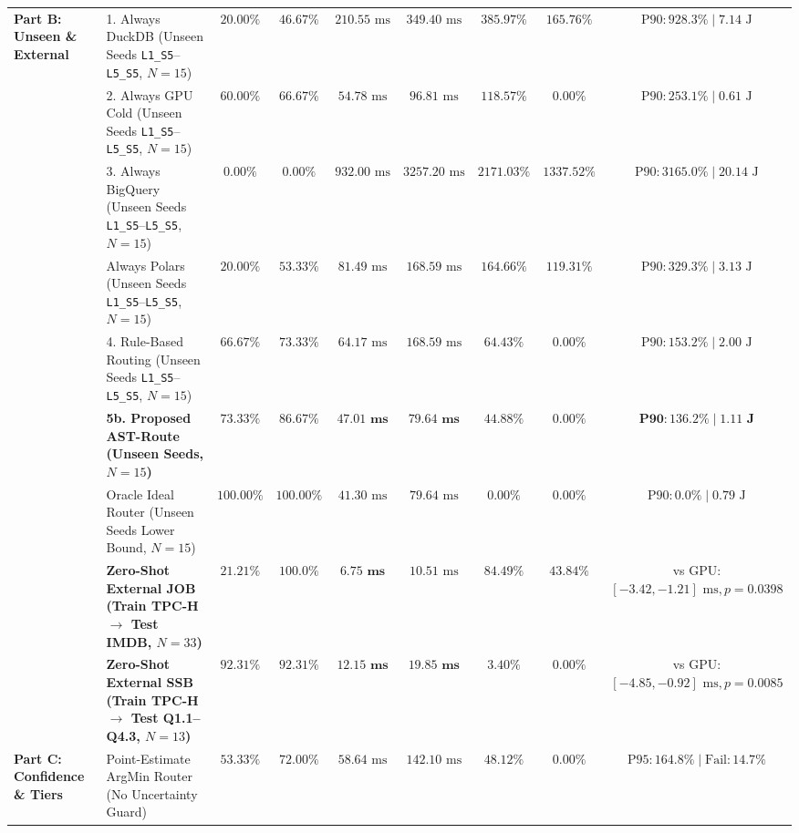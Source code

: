 \documentclass[10pt,a4paper]{article}
\begin{document}
\begin{table}[!t]
\begin{tabular}{@{}llccccccc@{}}
\midrule
\multirow{9}{*}{\textbf{Part B: Unseen \& External}}
 & 1. Always DuckDB (Unseen Seeds \texttt{L1\_S5}--\texttt{L5\_S5}, $N=15$) & $20.00\%$ & $46.67\%$ & $210.55\text{ ms}$ & $349.40\text{ ms}$ & $385.97\%$ & $165.76\%$ & $\text{P90}: 928.3\% \mid 7.14\text{ J}$ \\
 & 2. Always GPU Cold (Unseen Seeds \texttt{L1\_S5}--\texttt{L5\_S5}, $N=15$) & $60.00\%$ & $66.67\%$ & $54.78\text{ ms}$ & $96.81\text{ ms}$ & $118.57\%$ & $0.00\%$ & $\text{P90}: 253.1\% \mid 0.61\text{ J}$ \\
 & 3. Always BigQuery (Unseen Seeds \texttt{L1\_S5}--\texttt{L5\_S5}, $N=15$) & $0.00\%$ & $0.00\%$ & $932.00\text{ ms}$ & $3257.20\text{ ms}$ & $2171.03\%$ & $1337.52\%$ & $\text{P90}: 3165.0\% \mid 20.14\text{ J}$ \\
 & Always Polars (Unseen Seeds \texttt{L1\_S5}--\texttt{L5\_S5}, $N=15$) & $20.00\%$ & $53.33\%$ & $81.49\text{ ms}$ & $168.59\text{ ms}$ & $164.66\%$ & $119.31\%$ & $\text{P90}: 329.3\% \mid 3.13\text{ J}$ \\
 & 4. Rule-Based Routing (Unseen Seeds \texttt{L1\_S5}--\texttt{L5\_S5}, $N=15$) & $66.67\%$ & $73.33\%$ & $64.17\text{ ms}$ & $168.59\text{ ms}$ & $64.43\%$ & $0.00\%$ & $\text{P90}: 153.2\% \mid 2.00\text{ J}$ \\
 & \textbf{5b. Proposed AST-Route (Unseen Seeds, $N=15$)} & $\mathbf{73.33\%}$ & $\mathbf{86.67\%}$ & $\mathbf{47.01\text{ ms}}$ & $\mathbf{79.64\text{ ms}}$ & $\mathbf{44.88\%}$ & $\mathbf{0.00\%}$ & $\mathbf{\text{P90}: 136.2\% \mid 1.11\text{ J}}$ \\
 & Oracle Ideal Router (Unseen Seeds Lower Bound, $N=15$) & $100.00\%$ & $100.00\%$ & $41.30\text{ ms}$ & $79.64\text{ ms}$ & $0.00\%$ & $0.00\%$ & $\text{P90}: 0.0\% \mid 0.79\text{ J}$ \\
 & \textbf{Zero-Shot External JOB (Train TPC-H $\rightarrow$ Test IMDB, $N=33$)} & $21.21\%$ & $\mathbf{100.0\%}$ & $\mathbf{6.75\text{ ms}}$ & $10.51\text{ ms}$ & $84.49\%$ & $43.84\%$ & vs GPU: $[-3.42,-1.21]\text{ ms}, p=0.0398$ \\
 & \textbf{Zero-Shot External SSB (Train TPC-H $\rightarrow$ Test Q1.1--Q4.3, $N=13$)} & $\mathbf{92.31\%}$ & $\mathbf{92.31\%}$ & $\mathbf{12.15\text{ ms}}$ & $\mathbf{19.85\text{ ms}}$ & $\mathbf{3.40\%}$ & $\mathbf{0.00\%}$ & vs GPU: $[-4.85,-0.92]\text{ ms}, p=0.0085$ \\
\midrule
\multirow{5}{*}{\textbf{Part C: Confidence \& Tiers}}
 & Point-Estimate ArgMin Router (No Uncertainty Guard) & $53.33\%$ & $72.00\%$ & $58.64\text{ ms}$ & $142.10\text{ ms}$ & $48.12\%$ & $0.00\%$ & $\text{P95}: 164.8\% \mid \text{Fail}: 14.7\%$ \\

\end{tabular}
\end{table}
\end{document}
